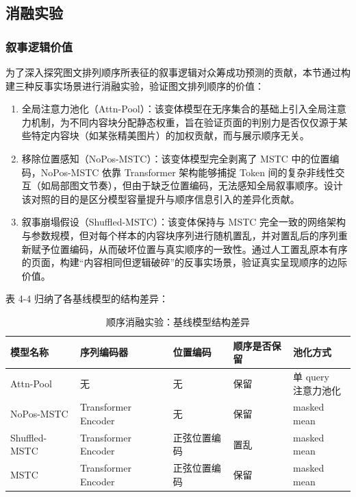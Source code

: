 \subsection{消融实验}
\subsubsection{叙事逻辑价值}
为了深入探究图文排列顺序所表征的叙事逻辑对众筹成功预测的贡献，本节通过构建三种反事实场景进行消融实验，验证图文排列顺序的价值：

\begin{enumerate}[label=(\arabic*)]
  \item 全局注意力池化（Attn-Pool）：该变体模型在无序集合的基础上引入全局注意力机制，为不同内容块分配静态权重，旨在验证页面的判别力是否仅仅源于某些特定内容块（如某张精美图片）的加权贡献，而与展示顺序无关。
  \item 移除位置感知（NoPos-MSTC）：该变体模型完全剥离了 MSTC 中的位置编码，NoPos-MSTC 依靠 Transformer 架构能够捕捉 Token 间的复杂非线性交互（如局部图文节奏），但由于缺乏位置编码，无法感知全局叙事顺序。设计该对照的目的是区分模型容量提升与顺序信息引入的差异化贡献。
  \item 叙事崩塌假设（Shuffled-MSTC）：该变体保持与 MSTC 完全一致的网络架构与参数规模，但对每个样本的内容块序列进行随机置乱，并对置乱后的序列重新赋予位置编码，从而破坏位置与真实顺序的一致性。通过人工置乱原本有序的页面，构建“内容相同但逻辑破碎”的反事实场景，验证真实呈现顺序的边际价值。
\end{enumerate}

表 4-4 归纳了各基线模型的结构差异：


\begin{table}[H]
\centering
\caption{顺序消融实验：基线模型结构差异}
\label{tab:exp4_4}
\begin{tabularx}{\textwidth}{@{}>{\raggedright\arraybackslash}p{3.0cm}>{\raggedright\arraybackslash}X>{\centering\arraybackslash}p{1.4cm}>{\centering\arraybackslash}p{2.1cm}>{\raggedright\arraybackslash}p{2.5cm}@{}}
\toprule
\textbf{模型名称} & \textbf{序列编码器} & \textbf{位置编码} & \textbf{顺序是否保留} & \textbf{池化方式} \\ \midrule
Attn-Pool & 无 & 无 & 保留 & \makecell[l]{单 query\\注意力池化} \\
NoPos-MSTC & Transformer Encoder & 无 & 保留 & masked mean \\
Shuffled-MSTC & Transformer Encoder & 正弦位置编码 & 置乱 & masked mean \\
MSTC & Transformer Encoder & 正弦位置编码 & 保留 & masked mean \\ \bottomrule
\end{tabularx}
\end{table}


